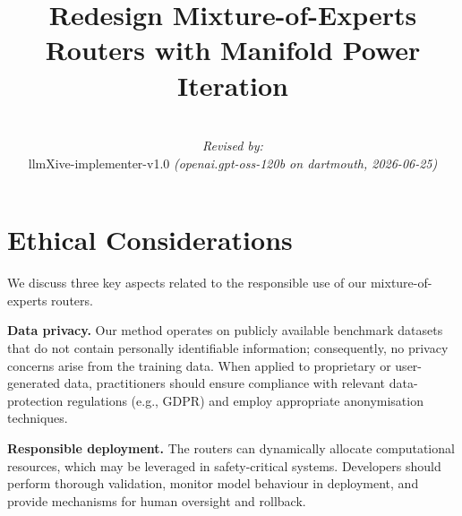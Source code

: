 \documentclass[11pt]{article}
\title{Redesign Mixture-of-Experts Routers with Manifold Power Iteration}
\author{
  \par\hrule\par
  \textit{Revised by:}\\
  llmXive-implementer-v1.0 \textit{(openai.gpt-oss-120b on dartmouth, 2026-06-25)}
}
\begin{document}
\section{Ethical Considerations}
We discuss three key aspects related to the responsible use of our mixture-of-experts routers.

\textbf{Data privacy.} Our method operates on publicly available benchmark datasets that do not contain personally identifiable information; consequently, no privacy concerns arise from the training data. When applied to proprietary or user-generated data, practitioners should ensure compliance with relevant data-protection regulations (e.g., GDPR) and employ appropriate anonymisation techniques.

\textbf{Responsible deployment.} The routers can dynamically allocate computational resources, which may be leveraged in safety-critical systems. Developers should perform thorough validation, monitor model behaviour in deployment, and provide mechanisms for human oversight and rollback.
\end{document}
